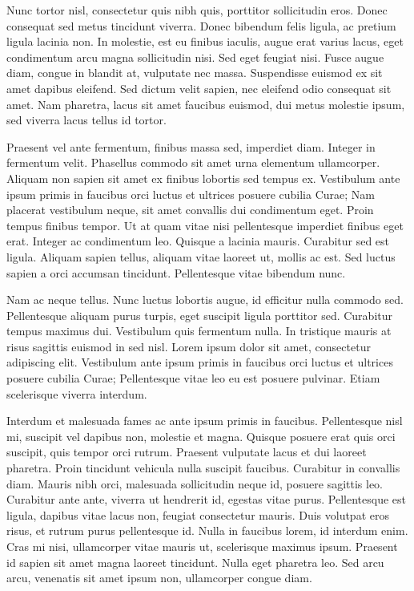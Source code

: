 \documentclass{article}
\begin{document}
	Nunc tortor nisl, consectetur quis nibh quis, porttitor sollicitudin eros. Donec consequat sed metus tincidunt viverra. Donec bibendum felis ligula, ac pretium ligula lacinia non. In molestie, est eu finibus iaculis, augue erat varius lacus, eget condimentum arcu magna sollicitudin nisi. Sed eget feugiat nisi. Fusce augue diam, congue in blandit at, vulputate nec massa. Suspendisse euismod ex sit amet dapibus eleifend. Sed dictum velit sapien, nec eleifend odio consequat sit amet. Nam pharetra, lacus sit amet faucibus euismod, dui metus molestie ipsum, sed viverra lacus tellus id tortor.
	
	Praesent vel ante fermentum, finibus massa sed, imperdiet diam. Integer in fermentum velit. Phasellus commodo sit amet urna elementum ullamcorper. Aliquam non sapien sit amet ex finibus lobortis sed tempus ex. Vestibulum ante ipsum primis in faucibus orci luctus et ultrices posuere cubilia Curae; Nam placerat vestibulum neque, sit amet convallis dui condimentum eget. Proin tempus finibus tempor. Ut at quam vitae nisi pellentesque imperdiet finibus eget erat. Integer ac condimentum leo. Quisque a lacinia mauris. Curabitur sed est ligula. Aliquam sapien tellus, aliquam vitae laoreet ut, mollis ac est. Sed luctus sapien a orci accumsan tincidunt. Pellentesque vitae bibendum nunc.
	
	Nam ac neque tellus. Nunc luctus lobortis augue, id efficitur nulla commodo sed. Pellentesque aliquam purus turpis, eget suscipit ligula porttitor sed. Curabitur tempus maximus dui. Vestibulum quis fermentum nulla. In tristique mauris at risus sagittis euismod in sed nisl. Lorem ipsum dolor sit amet, consectetur adipiscing elit. Vestibulum ante ipsum primis in faucibus orci luctus et ultrices posuere cubilia Curae; Pellentesque vitae leo eu est posuere pulvinar. Etiam scelerisque viverra interdum.
	
	Interdum et malesuada fames ac ante ipsum primis in faucibus. Pellentesque nisl mi, suscipit vel dapibus non, molestie et magna. Quisque posuere erat quis orci suscipit, quis tempor orci rutrum. Praesent vulputate lacus et dui laoreet pharetra. Proin tincidunt vehicula nulla suscipit faucibus. Curabitur in convallis diam. Mauris nibh orci, malesuada sollicitudin neque id, posuere sagittis leo. Curabitur ante ante, viverra ut hendrerit id, egestas vitae purus. Pellentesque est ligula, dapibus vitae lacus non, feugiat consectetur mauris. Duis volutpat eros risus, et rutrum purus pellentesque id. Nulla in faucibus lorem, id interdum enim. Cras mi nisi, ullamcorper vitae mauris ut, scelerisque maximus ipsum. Praesent id sapien sit amet magna laoreet tincidunt. Nulla eget pharetra leo. Sed arcu arcu, venenatis sit amet ipsum non, ullamcorper congue diam.
	
\end{document}
